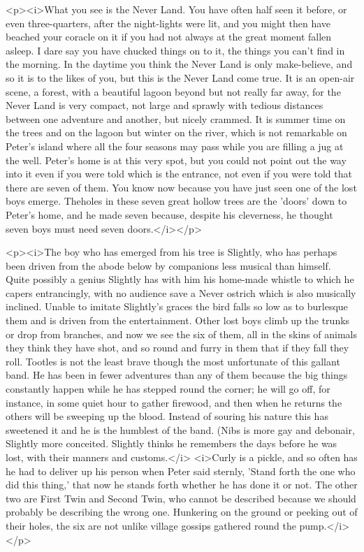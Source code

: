 <p><i>What you see is the Never Land. You have often half seen it
before, or even three-quarters, after the night-lights were lit, and
you might then have beached your coracle on it if you had not always
at the great moment fallen asleep. I dare say you have chucked things
on to it, the things you can't find in the morning. In the daytime
you think the Never Land is only make-believe, and so it is to the
likes of you, but this is the Never Land come true. It is an open-air
scene, a forest, with a beautiful lagoon beyond but not really far
away, for the Never Land is very compact, not large and sprawly with
tedious distances between one adventure and another, but nicely
crammed. It is summer time on the trees and on the lagoon but winter
on the river, which is not remarkable on Peter's island where all the
four seasons may pass while you are filling a jug at the well.
Peter's home is at this very spot, but you could not point out the
way into it even if you were told which is the entrance, not even if
you were told that there are seven of them. You know now because you
have just seen one of the lost boys emerge. Theholes in these seven
great hollow trees are the 'doors' down to Peter's home, and he made
seven because, despite his cleverness, he thought seven boys must
need seven doors.</i></p>

<p><i>The boy who has emerged from his tree is Slightly, who has
perhaps been driven from the abode below by companions less musical
than himself. Quite possibly a genius Slightly has with him his
home-made whistle to which he capers entrancingly, with no audience
save a Never ostrich which is also musically inclined. Unable to
imitate Slightly's graces the bird falls so low as to burlesque them
and is driven from the entertainment. Other lost boys climb up the
trunks or drop from branches, and now we see the six of them, all in
the skins of animals they think they have shot, and so round and
furry in them that if they fall they roll. Tootles is not the least
brave though the most unfortunate of this gallant band. He has been
in fewer adventures than any of them because the big things
constantly happen while he has stepped round the corner; he will go
off, for instance, in some quiet hour to gather firewood, and then
when he returns the others will be sweeping up the blood. Instead of
souring his nature this has sweetened it and he is the humblest of
the band. (Nibs is more gay and debonair, Slightly more conceited.
Slightly thinks he remembers the days before he was lost, with their
manners and customs.</i> <i>Curly is a pickle, and so often has he
had to deliver up his person when Peter said sternly, 'Stand forth
the one who did this thing,' that now he stands forth whether he has
done it or not. The other two are First Twin and Second Twin, who
cannot be described because we should probably be describing the
wrong one. Hunkering on the ground or peeking out of their holes, the
six are not unlike village gossips gathered round the pump.</i></p>

